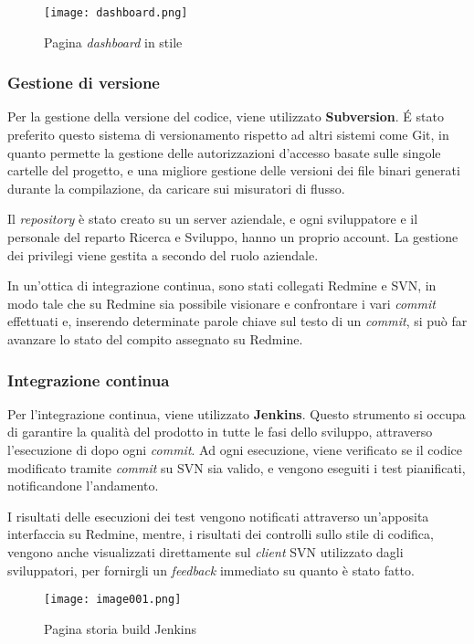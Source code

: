 \begin{figure}[H]
  \centering
  \texttt{[image: dashboard.png]}
  \caption{Pagina \textit{dashboard} in stile \textit{}}
\end{figure}

\subsubsection*{Gestione di versione} 

Per la gestione della versione del codice, viene utilizzato \textbf{Subversion}. 
É stato preferito questo sistema di versionamento rispetto ad altri sistemi come Git, in quanto permette la gestione delle autorizzazioni d'accesso basate sulle singole cartelle del progetto, e una migliore gestione delle versioni dei file binari generati durante la compilazione, da caricare sui misuratori di flusso.

Il \textit{repository} è stato creato su un server aziendale, e ogni sviluppatore e il personale del reparto Ricerca e Sviluppo, hanno un proprio account. La gestione dei privilegi viene gestita a secondo del ruolo aziendale.

In un'ottica di integrazione continua, sono stati collegati Redmine e SVN, in modo tale che su Redmine sia possibile visionare e confrontare i vari \textit{commit} effettuati e,  inserendo determinate parole chiave sul testo di un \textit{commit}, si può far avanzare lo stato del compito assegnato su Redmine.

\subsubsection*{Integrazione continua}

Per l'integrazione continua, viene utilizzato \textbf{Jenkins}.
Questo strumento si occupa di garantire la qualità del prodotto in tutte le fasi dello sviluppo, attraverso l'esecuzione di \textit{} dopo ogni \textit{commit}.
Ad ogni esecuzione, viene verificato se il codice modificato tramite \textit{commit} su SVN sia valido, e vengono eseguiti i test pianificati, notificandone l'andamento.

I risultati delle esecuzioni dei test vengono notificati attraverso un'apposita interfaccia su Redmine, mentre, i risultati dei controlli sullo stile di codifica, vengono anche visualizzati direttamente sul \textit{client} SVN utilizzato dagli sviluppatori, per fornirgli un \textit{feedback} immediato su quanto è stato fatto. 
\begin{figure}[H]
  \centering
  \texttt{[image: image001.png]}
  \caption{Pagina storia build Jenkins}
\end{figure}
